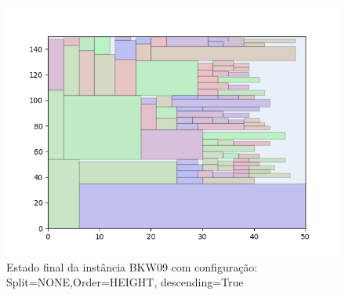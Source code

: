 \begin{figure}[H]
    \centering
    \caption[]{Estado final da instância BKW09 com configuração: Split=NONE,Order=HEIGHT, descending=True}
    \label{fig:bkw09-none-height-true}
    \includegraphics[scale=0.5]{output/figures/bkw/bkw09/none/height/true/000}
\end{figure}